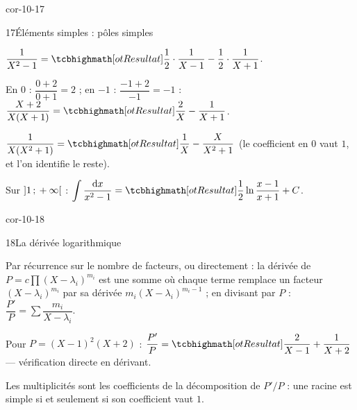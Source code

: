 \begin{blocLivre}{cor-10-17}
\begin{corrige}{17}{Éléments simples : pôles simples}
\begin{questions}
  \item $\dfrac{1}{X^{2}-1}
    =\res{\dfrac12\cdot\dfrac{1}{X-1}-\dfrac12\cdot\dfrac{1}{X+1}}$.
  \item En $0$ : $\dfrac{0+2}{0+1}=2$ ; en $-1$ : $\dfrac{-1+2}{-1}=-1$ :
    $\dfrac{X+2}{X(X+1)}=\res{\dfrac{2}{X}-\dfrac{1}{X+1}}$.
  \item $\dfrac{1}{X(X^{2}+1)}=\res{\dfrac1X-\dfrac{X}{X^{2}+1}}$
    (le coefficient en $0$ vaut $1$, et l'on identifie le reste).
  \item Sur $\mathopen{]}1\,{;}\,+\infty\mathclose{[}$ :
    $\displaystyle\int\frac{\mathrm{d}x}{x^{2}-1}
    =\res{\frac12\ln\frac{x-1}{x+1}}+C$.
\end{questions}
\end{corrige}
\end{blocLivre}

\begin{blocLivre}{cor-10-18}
\begin{corrige}{18}{La dérivée logarithmique}
\begin{questions}
  \item Par récurrence sur le nombre de facteurs, ou directement : la
    dérivée de $P=c\prod(X-\lambda_i)^{m_i}$ est une somme où chaque terme
    remplace un facteur $(X-\lambda_i)^{m_i}$ par sa dérivée
    $m_i(X-\lambda_i)^{m_i-1}$ ; en divisant par $P$ :
    $\dfrac{P'}{P}=\sum\dfrac{m_i}{X-\lambda_i}$.
  \item Pour $P=(X-1)^{2}(X+2)$ :
    $\dfrac{P'}{P}=\res{\dfrac{2}{X-1}+\dfrac{1}{X+2}}$ — vérification
    directe en dérivant.
  \item Les multiplicités sont les coefficients de la décomposition de
    $P'/P$ : une racine est simple si et seulement si son coefficient
    vaut $1$.
\end{questions}
\end{corrige}
\end{blocLivre}

